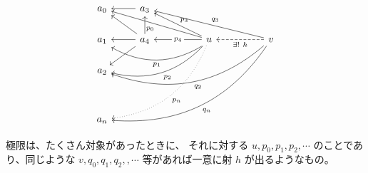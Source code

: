 \documentclass[uplatex,a4j,12pt,dvipdfmx]{jsarticle}
\begin{document}
\[
\begin{tikzcd}
a_{0} & a_{3} \arrow[l]                                 &  &                                                                                                                                                                                                       &  &                                                                                                                                       \\
a_{1} & a_{4} \arrow[lu] \arrow[u] \arrow[l] \arrow[ld] &  & u \arrow[llu, "p_{3}"'] \arrow[ll, "p_{4}" description] \arrow[lllu, "p_{0}"] \arrow[lll, "p_{1}", bend left, shift left] \arrow[llld, "p_{2}", bend left] \arrow[lllddd, "p_{n}", dotted, bend left] &  & v \arrow[ll, "\exists ! \ h", dashed] \arrow[llllu, "q_{3}"'] \arrow[lllllddd, "q_{n}", bend left] \arrow[llllld, "q_{2}", bend left] \\
a_{2} &                                                 &  &                                                                                                                                                                                                       &  &                                                                                                                                       \\
      &                                                 &  &                                                                                                                                                                                                       &  &                                                                                                                                       \\
a_{n} &                                                 &  &                                                                                                                                                                                                       &  &                                                                                                                                      
\end{tikzcd}
\]

極限は、たくさん対象があったときに、
それに対する $u,p_{0},p_{1},p_{2}, \cdots$ のことであり、同じような $v,q_{0},q_{1},q_{2},, \cdots$ 等があれば一意に射 $h$ が出るようなもの。
\end{document}
